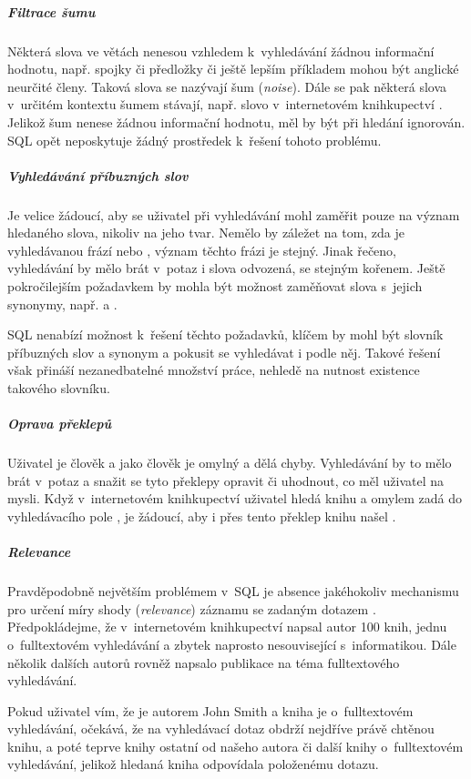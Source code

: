 \documentclass[11pt,oneside]{fithesis2}
\begin{document}
\subparagraph{Filtrace šumu}
Některá slova ve větách nenesou vzhledem k~vyhledávání žádnou informační hodnotu, např. spojky či předložky či ještě lepším příkladem mohou být anglické neurčité členy. Taková slova se nazývají šum (\emph{noise}). Dále se pak některá slova v~určitém kontextu
šumem stávají, např. slovo  v~internetovém knihkupectví \cite[s.~9]{HibernateSearchAction}. Jelikož šum nenese žádnou informační hodnotu, měl by být při hledání ignorován. SQL opět neposkytuje žádný prostředek k~řešení tohoto problému.

\subparagraph{Vyhledávání příbuzných slov}
Je velice žádoucí, aby se uživatel při vyhledávání mohl zaměřit pouze na význam hledaného slova, nikoliv na jeho tvar. Nemělo by záležet na tom, zda je vyhledávanou frází  nebo , význam těchto frázi
je stejný. Jinak řečeno, vyhledávání by mělo brát v~potaz i slova odvozená, se stejným kořenem. Ještě pokročilejším požadavkem by mohla být možnost zaměňovat slova s~jejich synonymy, např.  a  \cite[s.~10]{HibernateSearchAction}.

SQL nenabízí možnost k~řešení těchto požadavků, klíčem by mohl být slovník příbuzných slov a synonym a pokusit se vyhledávat i podle něj. Takové řešení však přináší nezanedbatelné množství práce, nehledě na nutnost existence takového slovníku.

\subparagraph{Oprava překlepů}
Uživatel je člověk a jako člověk je omylný a dělá chyby. Vyhledávání by to mělo brát v~potaz a snažit se tyto překlepy opravit či uhodnout, co měl uživatel na mysli. Když v~internetovém knihkupectví uživatel hledá knihu  a
omylem zadá do vyhledávacího pole , je žádoucí, aby i přes tento překlep knihu našel \cite[s.~10]{HibernateSearchAction}.

\subparagraph{Relevance}
Pravděpodobně největším problémem v~SQL je absence jakéhokoliv mechanismu pro určení míry shody (\emph{relevance}) záznamu se zadaným dotazem \cite[s.~10]{HibernateSearchAction}. Předpokládejme, že v~internetovém knihkupectví napsal autor  100 knih, jednu o~fulltextovém vyhledávání a zbytek naprosto nesouvisející s~informatikou. Dále několik dalších autorů rovněž napsalo publikace na téma fulltextového vyhledávání.

Pokud uživatel vím, že je autorem John Smith a kniha je o~fulltextovém vyhledávání, očekává, že na vyhledávací dotaz  obdrží nejdříve právě chtěnou knihu, a poté teprve knihy ostatní od našeho autora či
další knihy o~fulltextovém vyhledávání, jelikož hledaná kniha  odpovídala položenému dotazu.
\end{document}
